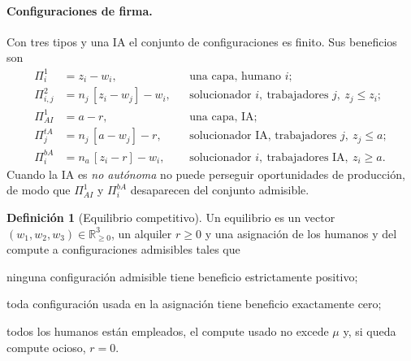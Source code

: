 \documentclass[11pt]{article}
\theoremstyle{plain}
\theoremstyle{definition}
\newtheorem{definicion}{Definición}
\theoremstyle{remark}
\newcommand{\ai}{a}
\newcommand{\N}{\mathsf{N}}
\newcommand{\Z}{\mathsf{Z}}
\newcommand{\Mk}{\mathsf{M}}
\begin{document}
\paragraph{Configuraciones de firma.} Con tres tipos y una IA el conjunto de configuraciones es
finito. Sus beneficios son
\begin{align*}
  \Pi^{1}_i &= z_i-w_i, &&\text{una capa, humano } i;\\
  \Pi^{2}_{i,j} &= n_j\,[z_i-w_j]-w_i, &&\text{solucionador } i,\ \text{trabajadores } j,\ z_j\le z_i;\\
  \Pi^{1}_{AI} &= \ai-r, &&\text{una capa, IA};\\
  \Pi^{tA}_{j} &= n_j\,[\ai-w_j]-r, &&\text{solucionador IA, trabajadores } j,\ z_j\le \ai;\\
  \Pi^{bA}_{i} &= n_a\,[z_i-r]-w_i, &&\text{solucionador } i,\ \text{trabajadores IA},\ z_i\ge \ai.
\end{align*}
Cuando la IA es \emph{no autónoma} no puede perseguir oportunidades de producción, de modo que
$\Pi^{1}_{AI}$ y $\Pi^{bA}_{i}$ desaparecen del conjunto admisible.

\begin{definicion}[Equilibrio competitivo]\label{def:eq}
Un equilibrio es un vector $(w_1,w_2,w_3)\in\mathbb R_{\ge0}^{3}$, un alquiler $r\ge0$ y una
asignación de los humanos y del compute a configuraciones admisibles tales que
\begin{description}[leftmargin=3em]
  \item[$(\N)$] ninguna configuración admisible tiene beneficio estrictamente positivo;
  \item[$(\Z)$] toda configuración usada en la asignación tiene beneficio exactamente cero;
  \item[$(\Mk)$] todos los humanos están empleados, el compute usado no excede $\mu$ y, si queda
  compute ocioso, $r=0$.
\end{description}
\end{definicion}
\end{document}
